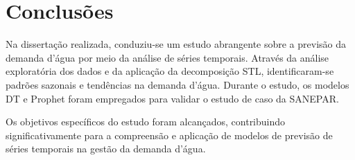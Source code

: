 \section{Conclus\~oes} \label{sec:conclusoes}

%
%


Na dissertação realizada, conduziu-se um estudo abrangente sobre a previsão da demanda d'água por meio da análise de séries temporais. Através da análise exploratória dos dados e da aplicação da decomposição STL, identificaram-se padrões sazonais e tendências na demanda d'água. Durante o estudo, os modelos DT e Prophet foram empregados para validar o estudo de caso da SANEPAR.

Os objetivos específicos do estudo foram alcançados, contribuindo significativamente para a compreensão e aplicação de modelos de previsão de séries temporais na gestão da demanda d'água.

